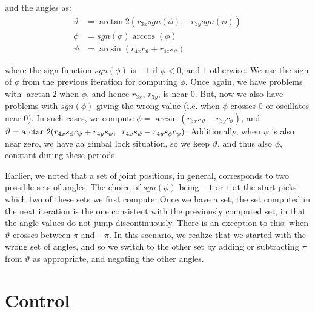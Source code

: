 \documentclass[11pt, a4paper]{article}
\begin{document}
    and the angles as:
    \begin{align*}
        \vartheta &= \arctan2(r_{3x}sgn(\phi), -r_{3y}sgn(\phi))\\
        \phi      &= sgn(\phi)\arccos(\phi)\\
        \psi      &= \arcsin(r_{4x}c_{\vartheta} + r_{4z}s_{\vartheta})
    \end{align*}

    where the sign function $sgn(\phi)$ is $-1$ if $\phi < 0$, and $1$ otherwise.
    We use the sign of $\phi$ from the previous iteration for computing $\phi$. 
    Once again, we have problems with $\arctan2$ when $\phi$, 
    and hence $r_{3x}$, $r_{3y}$, is near 0. But, now we also have problems 
    with $sgn(\phi)$ giving the wrong value 
    (i.e. when $\phi$ crosses 0 or oscillates near 0). %
    In such cases, we compute 
    $\phi = \arcsin(r_{3x}s_{\vartheta} - r_{3y}c_{\vartheta})$,
     and $\vartheta = \arctan2(
         r_{4x}s_{\phi}c_{\psi} + r_{4y}s_{\psi}, \hspace{0.2cm}
         r_{4x}s_{\psi} - r_{4y}s_{\phi}c_{\psi} 
     )$. 
     Additionally, when $\psi$ is also near zero, we have aa
     gimbal lock situation, so we keep $\vartheta$, and thus also $\phi$,
     constant during these periods.

     Earlier, we noted that a set of joint positions, in general, corresponds
     to two possible sets of angles. The choice of $sgn(\phi)$ being $-1$ or $1$
     at the start picks which two of these sets we first compute. Once we have 
     a set, the set computed in the next iteration is the one consistent with
     the previously computed set, in that the angle values do not jump discontinuously.
     There is an exception to this: when $\vartheta$ crosses between $\pi$ and $-\pi$.
     In this scenario, we realize that we started with the wrong set of angles,
     and so we switch to the other set by adding or subtracting $\pi$ from $\vartheta$
     as appropriate, and negating the other angles.




    \section{Control}
\end{document}
